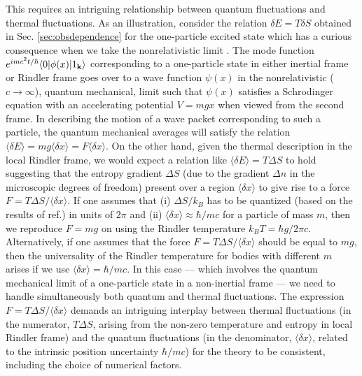 \documentclass[12pt]{iopart}
\begin{document}
 This requires an intriguing relationship between quantum fluctuations and thermal fluctuations. As an illustration, consider the 
 relation $\delta E=T\delta S$ obtained in Sec. \ref {sec:obsdependence} for the one-particle excited state which has a curious consequence when we take the nonrelativistic limit \cite{equipartition}.   
 The mode function $e^{imc^2 t/\hbar} \langle 0| \phi(x)|1_{\bf k}\rangle$ corresponding to
a one-particle state in either inertial frame or Rindler frame goes over to a wave function $\psi(x)$ in the  nonrelativistic ($c\to \infty$), quantum mechanical, limit such that $\psi(x)$
 satisfies a Schrodinger equation with an accelerating potential $V=mgx$ when viewed from the second frame. In describing the motion of a wave packet corresponding to such a particle,
  the quantum mechanical averages will satisfy the relation $\langle \delta E \rangle = mg \langle \delta x\rangle = F \langle \delta x\rangle$. On the other hand, given the thermal description in the local Rindler frame,
  we would expect a relation like $\langle \delta E \rangle = T\Delta S$ to hold suggesting that the entropy gradient $\Delta S$ (due to the gradient  $\Delta n$ in the microscopic degrees of freedom) present over a region $\langle \delta x\rangle$  to give rise to a force $F = T \Delta S/\langle \delta x\rangle$. If one assumes that (i) $\Delta S/k_B$ has to be quantized (based on the results of ref.\cite{entropyideas}) in units of $2\pi$ and (ii) $\langle \delta x\rangle \approx \hbar/mc$ for a particle of mass $m$, then we reproduce $F=mg$ on using the Rindler temperature $k_BT = \hbar g/2\pi c$. Alternatively, if one assumes that the force $F = T \Delta S/\langle \delta x\rangle$
should be equal to $mg$, then the universality of the Rindler temperature for bodies with different $m$ arises if we use $\langle \delta x\rangle = \hbar / mc$. In this case --- which involves  
 the quantum mechanical limit of a one-particle state in a non-inertial frame ---
 we need to handle simultaneously both quantum and thermal fluctuations. The expression $F = T \Delta S/\langle \delta x\rangle$  
 demands
  an intriguing interplay between thermal fluctuations (in the numerator, $T\Delta S$, arising from the non-zero temperature and entropy in local Rindler frame) and the quantum fluctuations (in the denominator, $\langle \delta x\rangle$, related to the intrinsic position uncertainty $\hbar/mc$) for the theory to be consistent, including the choice of numerical factors. 
 
 
 
 
 
\end{document}
